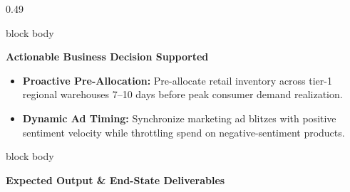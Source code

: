\documentclass[aspectratio=169, 10pt]{beamer}
\newenvironment{card}[1][]{%
        \begin{beamercolorbox}[rounded=true,shadow=false,wd=\linewidth,sep=3.5pt,#1]{block body}%
        \fontsize{7.8pt}{9.8pt}\selectfont%
    }{%
        \end{beamercolorbox}%
    }
\begin{document}
\begin{frame}[t]
\begin{columns}[T]
            \begin{column}{0.49\textwidth}                                                                                                                                                             
                \begin{card}                                                                                                                                                                           
                    \textbf{\color{NavyPrimary}Actionable Business Decision Supported}\\[0.03cm]                                                                                                       
                    \begin{itemize}\setlength{\itemsep}{1.2pt}                                                                                                                                         
                        \item \textbf{Proactive Pre-Allocation:} Pre-allocate retail inventory across tier-1 regional warehouses 7--10 days before peak consumer demand realization.                   
                        \item \textbf{Dynamic Ad Timing:} Synchronize marketing ad blitzes with positive sentiment velocity while throttling spend on negative-sentiment products.                     
                    \end{itemize}                                                                                                                                                                      
                \end{card}                                                                                                                                                                             
                \vspace{0.14cm}                                                                                                                                                                        
                \begin{card}                                                                                                                                                                           
                    \textbf{\color{CoralAccent}Expected Output \& End-State Deliverables}\\[0.03cm]                                                                                                    

\end{card}
\end{column}
\end{columns}
\end{frame}
\end{document}
